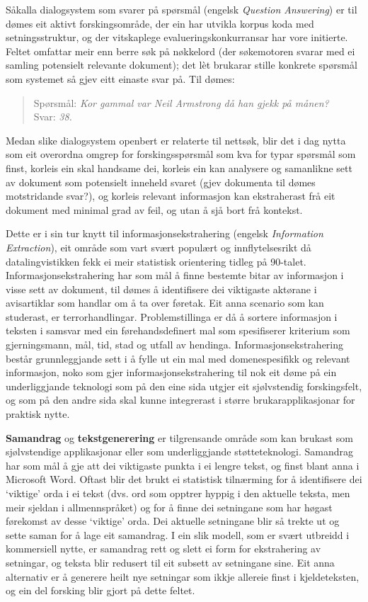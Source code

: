 \begin{multicols}{2}
Såkalla dialogsystem som svarer på spørsmål (engelsk \textit{Question Answering}) er til dømes eit aktivt forskingsområde, der ein har utvikla korpus koda med setningsstruktur, og der vitskaplege evalueringskonkurransar har vore initierte. Feltet omfattar meir enn berre søk på nøkkelord (der søkemotoren svarar med ei samling potensielt relevante dokument); det lèt brukarar stille konkrete spørsmål som systemet så gjev eitt einaste svar på. Til dømes:

\begin{quote}
Spørsmål: \textit{Kor gammal var Neil Armstrong då han gjekk på månen?}\\
Svar: \textit{38.}
\end{quote}

Medan slike dialogsystem openbert er relaterte til nettsøk, blir det i dag nytta som eit overordna omgrep for forskingsspørsmål som kva for typar spørsmål som finst, korleis ein skal handsame dei, korleis ein kan analysere og samanlikne sett av dokument som potensielt inneheld svaret (gjev dokumenta til dømes motstridande svar?), og korleis relevant informasjon kan ekstraherast frå eit dokument med minimal grad av feil, og utan å sjå bort frå kontekst.

Dette er i sin tur knytt til informasjonsekstrahering (engelsk \textit{Information Extraction}), eit område som vart svært populært og innflytelsesrikt då datalingvistikken fekk ei meir statistisk orientering tidleg på 90-talet. Informasjonsekstrahering har som mål å finne bestemte bitar av informasjon i visse sett av dokument, til dømes å identifisere dei viktigaste aktørane i avisartiklar som handlar om å ta over føretak. Eit anna scenario som kan studerast, er terrorhandlingar. Problemstillinga er då å sortere informasjon i teksten i samsvar med ein førehandsdefinert mal som spesifiserer kriterium som gjerningsmann, mål, tid, stad og utfall av hendinga. Informasjonsekstrahering består grunnleggjande sett i å fylle ut ein mal med domenespesifikk og relevant informasjon, noko som gjer informasjonsekstrahering til nok eit døme på ein underliggjande teknologi som på den eine sida utgjer eit sjølvstendig forskingsfelt, og som på den andre sida skal kunne integrerast i større brukarapplikasjonar for praktisk nytte.

\textbf{Samandrag} og \textbf{tekstgenerering} er tilgrensande område som kan brukast som sjølvstendige applikasjonar eller som underliggjande støtteteknologi. Samandrag har som mål å gje att dei viktigaste punkta i ei lengre tekst, og finst blant anna i Microsoft Word. Oftast blir det brukt ei statistisk tilnærming for å identifisere dei `viktige' orda i ei tekst (dvs. ord som opptrer hyppig i den aktuelle teksta, men meir sjeldan i allmennspråket) og for å finne dei setningane som har høgast førekomst av desse `viktige' orda. Dei aktuelle setningane blir så trekte ut og sette saman for å lage eit samandrag. I ein slik modell, som er svært utbreidd i kommersiell nytte, er samandrag rett og slett ei form for ekstrahering av setningar, og teksta blir redusert til eit subsett av setningane sine. Eit anna alternativ er å generere heilt nye setningar som ikkje allereie finst i kjeldeteksten, og ein del forsking blir gjort på dette feltet.


\end{multicols}

